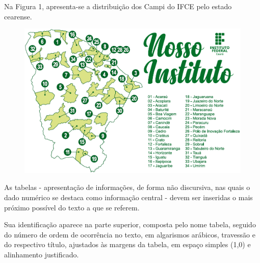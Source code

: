 Na Figura 1, apresenta-se a distribuição dos Campi do IFCE pelo estado cearense.

\begin{figure}[!ht]
    \centering
    \label{campi}
    \includegraphics[scale=0.5]{figuras/ifce-estado}
\end{figure}

\newpage


As tabelas - apresentação de informações, de forma não discursiva, nas quais o dado numérico se destaca como informação central - devem ser inseridas o mais próximo possível do texto a que se referem.

Sua identificação aparece na parte superior, composta pelo nome tabela, seguido do número de ordem de ocorrência no texto, em algarismos arábicos, travessão e do respectivo título, ajustados às margens da tabela, em espaço simples (1,0) e alinhamento justificado.

